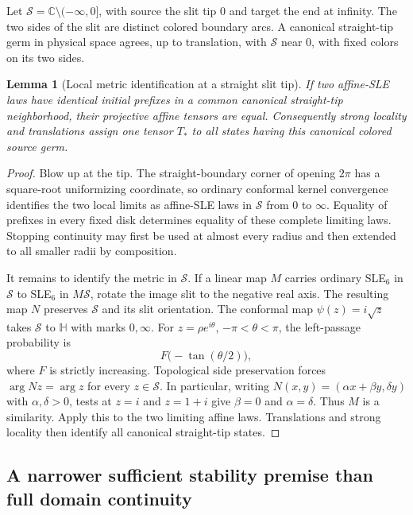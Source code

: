 \documentclass[11pt]{article}
\newtheorem{lemma}[theorem]{Lemma}
\theoremstyle{definition}\newtheorem{definition}[theorem]{Definition}
\theoremstyle{remark}\newtheorem{remark}[theorem]{Remark}
\begin{document}
Let $\mathcal S=\mathbb C\setminus(-\infty,0]$, with source the slit tip $0$
and target the end at infinity. The two sides of the slit are distinct colored
boundary arcs. A canonical straight-tip germ in physical space agrees, up to
translation, with $\mathcal S$ near $0$, with fixed colors on its two sides.

\begin{lemma}[Local metric identification at a straight slit tip]
\label{lem:sl-slitidentify}
If two affine-SLE laws have identical initial prefixes in a common canonical
straight-tip neighborhood, their projective affine tensors are equal.
Consequently strong locality and translations assign one tensor $T_*$ to
all states having this canonical colored source germ.
\end{lemma}
\begin{proof}
Blow up at the tip. The straight-boundary corner of opening $2\pi$ has a
square-root uniformizing coordinate, so ordinary conformal kernel convergence
identifies the two local limits as affine-SLE laws in $\mathcal S$ from $0$
to $\infty$. Equality of prefixes in every fixed disk determines equality
of these complete limiting laws. Stopping continuity may first be used at
almost every radius and then extended to all smaller radii by composition.

It remains to identify the metric in $\mathcal S$. If a linear map $M$ carries
ordinary SLE$_6$ in $\mathcal S$ to SLE$_6$ in $M\mathcal S$, rotate the image
slit to the negative real axis. The resulting map $N$ preserves $\mathcal S$
and its slit orientation. The conformal map $\psi(z)=i\sqrt z$ takes
$\mathcal S$ to $\mathbb H$ with marks $0,\infty$. For
$z=\rho e^{i\theta}$, $-\pi<\theta<\pi$, the left-passage probability is
\[
 F\bigl(-\tan(\theta/2)\bigr),
\]
where $F$ is strictly increasing. Topological side preservation forces
$\arg Nz=\arg z$ for every $z\in\mathcal S$. In particular, writing
$N(x,y)=(\alpha x+\beta y,\delta y)$ with $\alpha,\delta>0$, tests at
$z=i$ and $z=1+i$ give $\beta=0$ and $\alpha=\delta$. Thus $M$ is a similarity.
Apply this to the two limiting affine laws. Translations and strong locality
then identify all canonical straight-tip states.
\end{proof}

\subsection{A narrower sufficient stability premise than full domain continuity}
\end{document}
